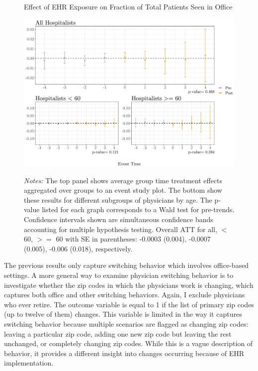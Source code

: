 \documentclass[11pt]{article}
\begin{document}
\begin{figure}[ht]
    \centering
    \caption{Effect of EHR Exposure on Fraction of Total Patients Seen in Office}
    \includegraphics[scale=.65]{Objects/officefrac_plot.pdf}
    \label{fig:officesecond}
    \vspace{2mm}
    \caption*{\footnotesize{\textit{Notes:} The top panel shows average group time treatment effects aggregated over groups to an event study plot. The bottom show these results for different subgroups of physicians by age. The p-value listed for each graph corresponds to a Wald test for pre-trends. Confidence intervals shown are simultaneous confidence bands accounting for multiple hypothesis testing. Overall ATT for all, $<$ 60, $>=$ 60 with SE in parentheses: -0.0003 (0.004), -0.0007 (0.005), -0.006 (0.018), respectively.}}
\end{figure}

The previous results only capture switching behavior which involves office-based settings. A more general way to examine physician switching behavior is to investigate whether the zip codes in which the physicians work is changing, which captures both office and other switching behaviors. Again, I exclude physicians who ever retire. The outcome variable is equal to 1 if the list of primary zip codes (up to twelve of them) changes. This variable is limited in the way it captures switching behavior because multiple scenarios are flagged as changing zip codes: leaving a particular zip code, adding one new zip code but leaving the rest unchanged, or completely changing zip codes. While this is a vague description of behavior, it provides a different insight into changes occurring because of EHR implementation.
\end{document}
